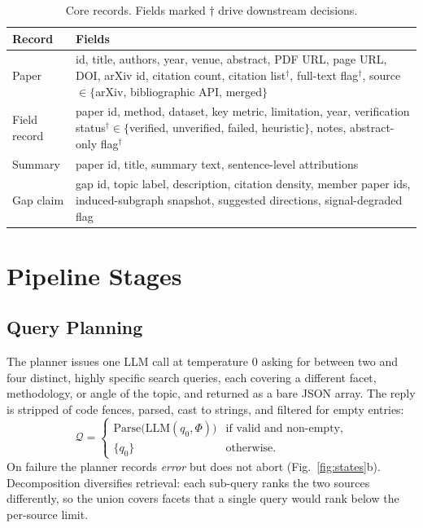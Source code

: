 \documentclass[conference]{IEEEtran}
\newcommand{\cQ}{\mathcal{Q}}
\begin{document}
\begin{table}[!t]
\caption{Core records. Fields marked $\dagger$ drive downstream decisions.}
\label{tab:records}
\centering
\small
\begin{tabular}{@{}p{1.55cm}p{6.35cm}@{}}
\toprule
Record & Fields \\
\midrule
Paper & id, title, authors, year, venue, abstract, PDF URL, page URL, DOI, arXiv id, citation count, citation list$^\dagger$, full-text flag$^\dagger$, source $\in\{$arXiv, bibliographic API, merged$\}$ \\
Field record & paper id, method, dataset, key metric, limitation, year, verification status$^\dagger\in\{$verified, unverified, failed, heuristic$\}$, notes, abstract-only flag$^\dagger$ \\
Summary & paper id, title, summary text, sentence-level attributions \\
Gap claim & gap id, topic label, description, citation density, member paper ids, induced-subgraph snapshot, suggested directions, signal-degraded flag \\
\bottomrule
\end{tabular}
\end{table}
\section{Pipeline Stages}
\label{sec:stages}

\subsection{Query Planning}
The planner issues one LLM call at temperature $0$ asking for between two and four distinct, highly specific search queries, each covering a different facet, methodology, or angle of the topic, and returned as a bare JSON array. The reply is stripped of code fences, parsed, cast to strings, and filtered for empty entries:
\begin{equation}
\cQ=\begin{cases}\mathrm{Parse}\big(\mathrm{LLM}(q_0,\Phi)\big) & \text{if valid and non-empty},\\ \{q_0\} & \text{otherwise.}\end{cases}
\label{eq:plan}
\end{equation}
On failure the planner records \textit{error} but does not abort (Fig.~\ref{fig:states}b). Decomposition diversifies retrieval: each sub-query ranks the two sources differently, so the union covers facets that a single query would rank below the per-source limit.
\end{document}
